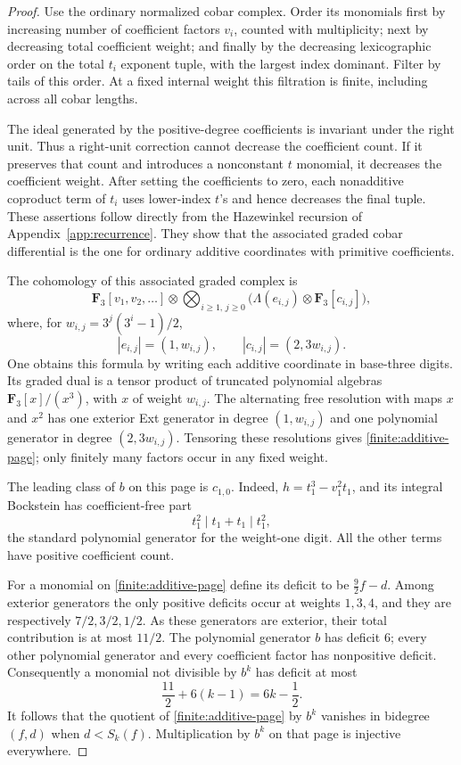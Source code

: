\documentclass[11pt]{article}
\theoremstyle{definition}
\theoremstyle{remark}
\numberwithin{equation}{section}
\begin{document}
\begin{proof}
Use the ordinary normalized cobar complex.  Order its monomials
first by increasing number of coefficient factors $v_i$, counted
with multiplicity; next by decreasing total coefficient weight;
and finally by the decreasing lexicographic order on the total
$t_i$ exponent tuple, with the largest index dominant.  Filter by
tails of this order.  At a fixed internal weight this filtration
is finite, including across all cobar lengths.

The ideal generated by the positive-degree coefficients is
invariant under the right unit.  Thus a right-unit correction cannot
decrease the coefficient count.  If it preserves that count and
introduces a nonconstant $t$ monomial, it decreases the coefficient
weight.  After setting the coefficients to zero, each nonadditive
coproduct term of $t_i$ uses lower-index $t$'s and hence decreases
the final tuple.  These assertions follow directly from the
Hazewinkel recursion of Appendix~\ref{app:recurrence}.  They show
that the associated graded cobar differential is the one for
ordinary additive coordinates with primitive coefficients.

The cohomology of this associated graded complex is
\begin{equation}\label{finite:additive-page}
 \mathbf F_3[v_1,v_2,\ldots]\otimes
 \bigotimes_{i\geq1,\,j\geq0}
 \bigl(\Lambda(e_{i,j})\otimes\mathbf F_3[c_{i,j}]\bigr),
\end{equation}
where, for $w_{i,j}=3^j(3^i-1)/2$,
\[
 |e_{i,j}|=(1,w_{i,j}),\qquad |c_{i,j}|=(2,3w_{i,j}).
\]
One obtains this formula by writing each additive coordinate in
base-three digits.  Its graded dual is a tensor product of
truncated polynomial algebras $\mathbf F_3[x]/(x^3)$, with $x$ of weight
$w_{i,j}$.  The alternating free resolution with maps $x$ and
$x^2$ has one exterior Ext generator in degree $(1,w_{i,j})$ and
one polynomial generator in degree $(2,3w_{i,j})$.  Tensoring these
resolutions gives \eqref{finite:additive-page}; only finitely many
factors occur in any fixed weight.

The leading class of $b$ on this page is $c_{1,0}$.  Indeed,
$h=t_1^3-v_1^2t_1$, and its integral Bockstein has coefficient-free
part
\[
 t_1^2\mid t_1+t_1\mid t_1^2,
\]
the standard polynomial generator for the weight-one digit.
All the other terms have positive coefficient count.

For a monomial on \eqref{finite:additive-page} define its deficit
to be $\frac92f-d$.  Among exterior generators the only positive
deficits occur at weights $1,3,4$, and they are respectively
$7/2,3/2,1/2$.  As these generators are exterior, their total
contribution is at most $11/2$.  The polynomial generator $b$
has deficit $6$; every other polynomial generator and every
coefficient factor has nonpositive deficit.  Consequently a
monomial not divisible by $b^k$ has deficit at most
\[
 \frac{11}{2}+6(k-1)=6k-\frac12.
\]
It follows that the quotient of \eqref{finite:additive-page} by
$b^k$ vanishes in bidegree $(f,d)$ when $d<S_k(f)$.
Multiplication by $b^k$ on that page is injective everywhere.


\end{proof}
\end{document}

